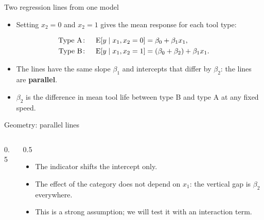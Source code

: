 \begin{frame}{Two regression lines from one model}
    \begin{itemize}
        \item Setting $x_2 = 0$ and $x_2 = 1$ gives the mean response for each tool type:
    \end{itemize}
    \begin{align*}
        \text{Type A}\colon \quad \operatorname{E}[y \mid x_1, x_2 = 0] &= \beta_0 + \beta_1 x_1, \\
        \text{Type B}\colon \quad \operatorname{E}[y \mid x_1, x_2 = 1] &= (\beta_0 + \beta_2) + \beta_1 x_1.
    \end{align*}
    \begin{itemize}
        \item The lines have the same slope $\beta_1$ and intercepts that differ by $\beta_2$: the lines are \textbf{parallel}.
        \item $\beta_2$ is the difference in mean tool life between type B and type A at any fixed speed.
    \end{itemize}
\end{frame}


\begin{frame}{Geometry: parallel lines}
    \begin{columns}[T]
        \begin{column}{0.5\textwidth}
            \begin{center}
            \end{center}
        \end{column}
        \begin{column}{0.5\textwidth}
            \begin{itemize}
                \item The indicator shifts the intercept only.
                \item The effect of the category does not depend on $x_1$: the vertical gap is $\beta_2$ everywhere.
                \item This is a strong assumption; we will test it with an interaction term.
            \end{itemize}
        \end{column}
    \end{columns}
\end{frame}



